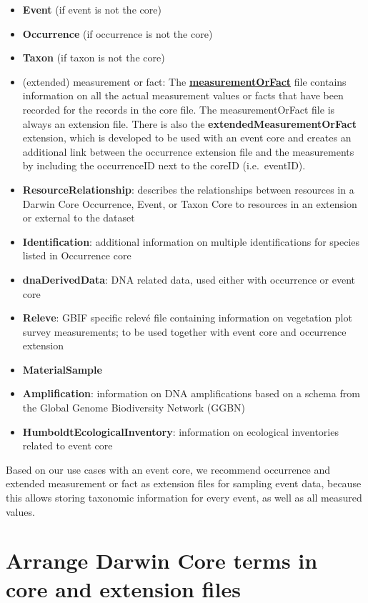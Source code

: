\documentclass[
]{book}
\begin{document}
\begin{itemize}
\item
  \textbf{Event} (if event is not the core)
\item
  \textbf{Occurrence} (if occurrence is not the core)
\item
  \textbf{Taxon} (if taxon is not the core)
\item
  (extended) measurement or fact: The \protect\hyperlink{measurementorfact}{\textbf{measurementOrFact}} file contains information on all the actual measurement values or facts that have been recorded for the records in the core file. The measurementOrFact file is always an extension file. There is also the \textbf{extendedMeasurementOrFact} extension, which is developed to be used with an event core and creates an additional link between the occurrence extension file and the measurements by including the occurrenceID next to the coreID (i.e.~eventID).
\item
  \textbf{ResourceRelationship}: describes the relationships between resources in a Darwin Core Occurrence, Event, or Taxon Core to resources in an extension or external to the dataset
\item
  \textbf{Identification}: additional information on multiple identifications for species listed in Occurrence core
\item
  \textbf{dnaDerivedData}: DNA related data, used either with occurrence or event core
\item
  \textbf{Releve}: GBIF specific relevé file containing information on vegetation plot survey measurements; to be used together with event core and occurrence extension
\item
  \textbf{MaterialSample}
\item
  \textbf{Amplification}: information on DNA amplifications based on a schema from the Global Genome Biodiversity Network (GGBN)
\item
  \textbf{HumboldtEcologicalInventory}: information on ecological inventories related to event core
\end{itemize}

Based on our use cases with an event core, we recommend occurrence and extended measurement or fact as extension files for sampling event data, because this allows storing taxonomic information for every event, as well as all measured values.

\hypertarget{arrange-darwin-core-terms-in-core-and-extension-files}{%
\section{Arrange Darwin Core terms in core and extension files}\label{arrange-darwin-core-terms-in-core-and-extension-files}}
\end{document}
